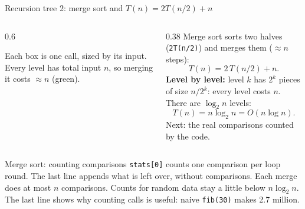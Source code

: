 \documentclass[aspectratio=169,10pt]{beamer}
\begin{document}
\begin{frame}{Recursion tree 2: merge sort and $T(n)=2T(n/2)+n$}
\begin{columns}[T]
\begin{column}{0.6\textwidth}
\begin{sfig}[0.7]
\end{sfig}
{\scriptsize Each box is one call, sized by its input. Every level has total input $n$, so merging it costs $\approx n$ (green).}
\end{column}
\begin{column}{0.38\textwidth}
{\small
Merge sort sorts two halves (\texttt{2T(n/2)}) and merges them ($\approx n$ steps):
\[T(n)=2\,T(n/2)+n.\]
\textbf{Level by level:} level $k$ has $2^k$ pieces of size $n/2^k$: every level costs $n$. There are $\log_2 n$ levels:
\[T(n)=n\log_2 n = O(n\log n).\]
Next: the real comparisons counted by the code.}
\end{column}
\end{columns}
\end{frame}

\begin{frame}[allowframebreaks]{Merge sort: counting comparisons}
\vspace{2mm}
{\small \texttt{stats[0]} counts one comparison per loop round. The last line appends what is left over, without comparisons. Each merge does at most $n$ comparisons.}
\framebreak
{}
\vspace{2mm}
\vspace{2mm}
{\small Counts for random data stay a little below $n\log_2 n$. The last line shows why counting calls is useful: naive \texttt{fib(30)} makes 2.7 million.}
\end{frame}
\end{document}
